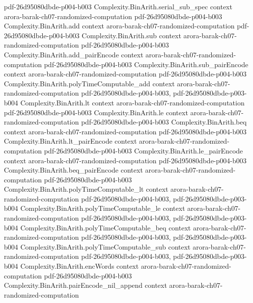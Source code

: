 \begin{theorem}
  {pdf-26d95080dbde-p004-b003}
\proofstep
  {Complexity.BinArith.serial_sub_spec}
  {context}
  {arora-barak-ch07-randomized-computation}
  {pdf-26d95080dbde-p004-b003}
\proofstep
  {Complexity.BinArith.add}
  {context}
  {arora-barak-ch07-randomized-computation}
  {pdf-26d95080dbde-p004-b003}
\proofstep
  {Complexity.BinArith.sub}
  {context}
  {arora-barak-ch07-randomized-computation}
  {pdf-26d95080dbde-p004-b003}
\proofstep
  {Complexity.BinArith.add_pairEncode}
  {context}
  {arora-barak-ch07-randomized-computation}
  {pdf-26d95080dbde-p004-b003}
\proofstep
  {Complexity.BinArith.sub_pairEncode}
  {context}
  {arora-barak-ch07-randomized-computation}
  {pdf-26d95080dbde-p004-b003}
\proofstep
  {Complexity.BinArith.polyTimeComputable_add}
  {context}
  {arora-barak-ch07-randomized-computation}
  {pdf-26d95080dbde-p004-b003,
    pdf-26d95080dbde-p003-b004}
\proofstep
  {Complexity.BinArith.lt}
  {context}
  {arora-barak-ch07-randomized-computation}
  {pdf-26d95080dbde-p004-b003}
\proofstep
  {Complexity.BinArith.le}
  {context}
  {arora-barak-ch07-randomized-computation}
  {pdf-26d95080dbde-p004-b003}
\proofstep
  {Complexity.BinArith.beq}
  {context}
  {arora-barak-ch07-randomized-computation}
  {pdf-26d95080dbde-p004-b003}
\proofstep
  {Complexity.BinArith.lt_pairEncode}
  {context}
  {arora-barak-ch07-randomized-computation}
  {pdf-26d95080dbde-p004-b003}
\proofstep
  {Complexity.BinArith.le_pairEncode}
  {context}
  {arora-barak-ch07-randomized-computation}
  {pdf-26d95080dbde-p004-b003}
\proofstep
  {Complexity.BinArith.beq_pairEncode}
  {context}
  {arora-barak-ch07-randomized-computation}
  {pdf-26d95080dbde-p004-b003}
\proofstep
  {Complexity.BinArith.polyTimeComputable_lt}
  {context}
  {arora-barak-ch07-randomized-computation}
  {pdf-26d95080dbde-p004-b003,
    pdf-26d95080dbde-p003-b004}
\proofstep
  {Complexity.BinArith.polyTimeComputable_le}
  {context}
  {arora-barak-ch07-randomized-computation}
  {pdf-26d95080dbde-p004-b003,
    pdf-26d95080dbde-p003-b004}
\proofstep
  {Complexity.BinArith.polyTimeComputable_beq}
  {context}
  {arora-barak-ch07-randomized-computation}
  {pdf-26d95080dbde-p004-b003,
    pdf-26d95080dbde-p003-b004}
\proofstep
  {Complexity.BinArith.polyTimeComputable_sub}
  {context}
  {arora-barak-ch07-randomized-computation}
  {pdf-26d95080dbde-p004-b003,
    pdf-26d95080dbde-p003-b004}
\proofstep
  {Complexity.BinArith.encWords}
  {context}
  {arora-barak-ch07-randomized-computation}
  {pdf-26d95080dbde-p004-b003}
\proofstep
  {Complexity.BinArith.pairEncode_nil_append}
  {context}
  {arora-barak-ch07-randomized-computation}

\end{theorem}
